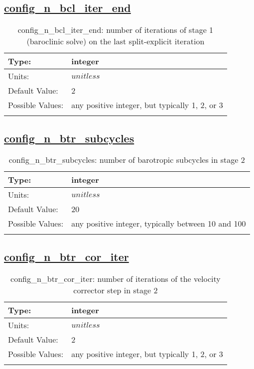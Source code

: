 \subsection[config\_n\_bcl\_iter\_end]{\hyperref[sec:nm_tab_split_explicit_ts]{config\_n\_bcl\_iter\_end}}
\label{subsec:nm_sec_config_n_bcl_iter_end}
\begin{center}
\begin{longtable}{| p{2.0in} | p{4.0in} |}
    \hline
    Type: & integer \\
    \hline
    Units: & $unitless$ \\
    \hline
    Default Value: & 2 \\
    \hline
    Possible Values: & any positive integer, but typically 1, 2, or 3 \\
    \hline
    \caption{config\_n\_bcl\_iter\_end: number of iterations of stage 1 (baroclinic solve) on the last split-explicit iteration}
\end{longtable}
\end{center}
\subsection[config\_n\_btr\_subcycles]{\hyperref[sec:nm_tab_split_explicit_ts]{config\_n\_btr\_subcycles}}
\label{subsec:nm_sec_config_n_btr_subcycles}
\begin{center}
\begin{longtable}{| p{2.0in} | p{4.0in} |}
    \hline
    Type: & integer \\
    \hline
    Units: & $unitless$ \\
    \hline
    Default Value: & 20 \\
    \hline
    Possible Values: & any positive integer, typically between 10 and 100 \\
    \hline
    \caption{config\_n\_btr\_subcycles: number of barotropic subcycles in stage 2}
\end{longtable}
\end{center}
\subsection[config\_n\_btr\_cor\_iter]{\hyperref[sec:nm_tab_split_explicit_ts]{config\_n\_btr\_cor\_iter}}
\label{subsec:nm_sec_config_n_btr_cor_iter}
\begin{center}
\begin{longtable}{| p{2.0in} | p{4.0in} |}
    \hline
    Type: & integer \\
    \hline
    Units: & $unitless$ \\
    \hline
    Default Value: & 2 \\
    \hline
    Possible Values: & any positive integer, but typically 1, 2, or 3 \\
    \hline
    \caption{config\_n\_btr\_cor\_iter: number of iterations of the velocity corrector step in stage 2}
\end{longtable}
\end{center}
